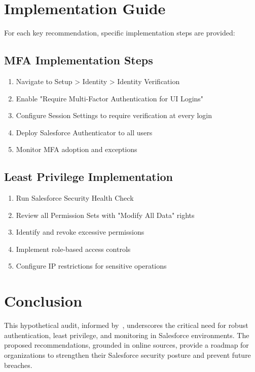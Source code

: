 \documentclass[12pt,a4paper]{article}
\begin{document}
\section{Implementation Guide}
For each key recommendation, specific implementation steps are provided:

\subsection{MFA Implementation Steps}
\begin{enumerate}
    \item Navigate to Setup > Identity > Identity Verification
    \item Enable "Require Multi-Factor Authentication for UI Logins"
    \item Configure Session Settings to require verification at every login
    \item Deploy Salesforce Authenticator to all users
    \item Monitor MFA adoption and exceptions
\end{enumerate}

\subsection{Least Privilege Implementation}
\begin{enumerate}
    \item Run Salesforce Security Health Check
    \item Review all Permission Sets with "Modify All Data" rights
    \item Identify and revoke excessive permissions
    \item Implement role-based access controls
    \item Configure IP restrictions for sensitive operations
\end{enumerate}

\section{Conclusion}
This hypothetical audit, informed by~\cite{reliaquest2025}, underscores the critical need for robust authentication, least privilege, and monitoring in Salesforce environments. The proposed recommendations, grounded in online sources, provide a roadmap for organizations to strengthen their Salesforce security posture and prevent future breaches.
\end{document}
